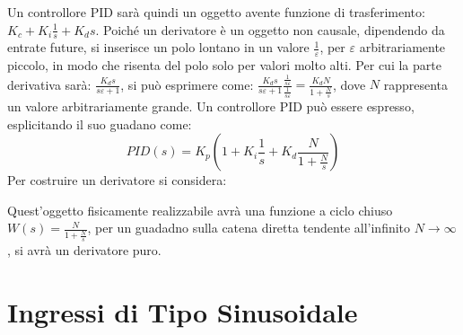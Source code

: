 \documentclass{article}
\numberwithin{equation}{subsection}
\begin{document}
Un controllore PID sarà quindi un 
oggetto avente funzione di trasferimento: $K_c+K_i\displaystyle\frac{1}{s}+K_ds$. Poiché un derivatore è un oggetto non causale, dipendendo da entrate future, si 
inserisce un polo lontano in un valore 
$\displaystyle\frac{1}{\varepsilon}$, per $\varepsilon$ arbitrariamente piccolo, in modo che risenta del polo solo per valori molto alti. Per cui la parte derivativa sarà: 
$\displaystyle\frac{K_ds}{s\varepsilon+1}$, si può esprimere come: 
$\displaystyle\frac{K_ds}{s\varepsilon+1}\frac{\displaystyle\frac{1}{s\varepsilon}}{\displaystyle\frac{1}{s\varepsilon}}=\frac{K_dN}{1+\displaystyle\frac{N}{s}}$, dove 
$N$ rappresenta un valore arbitrariamente grande. Un controllore PID può essere espresso, esplicitando il suo guadano come: 
\begin{equation}
    PID(s)=K_p\left(1+K_i\displaystyle\frac{1}{s}+K_d\frac{N}{1+\displaystyle\frac{N}{s}}\right)
\end{equation}
Per costruire un derivatore si considera: 

\begin{center}\end{center}

Quest'oggetto fisicamente realizzabile avrà una funzione a ciclo chiuso $W(s)=\displaystyle\frac{N}{1+\displaystyle\frac{N}{s}}$, per un guadadno sulla catena diretta 
tendente all'infinito $N\to\infty$, si avrà un derivatore puro. 


\clearpage 

\section{Ingressi di Tipo Sinusoidale}
\end{document}
